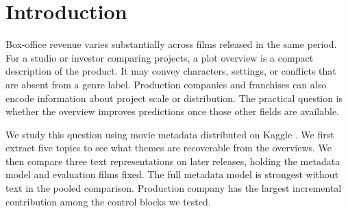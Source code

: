 \section{Introduction}

Box-office revenue varies substantially across films released in the same
period. For a studio or investor comparing projects, a plot overview is a compact
description of the product. It may convey characters, settings, or conflicts
that are absent from a genre label. Production companies and franchises can
also encode information about project scale or distribution. The practical
question is whether the overview improves predictions once those other fields
are available.

We study this question using movie metadata distributed on Kaggle
\cite{movies}. We first extract five topics to see what themes are recoverable
from the overviews. We then compare three text representations on later releases,
holding the metadata model and evaluation films fixed. The full metadata model
is strongest without text in the pooled comparison. Production company has the
largest incremental contribution among the control blocks we tested.
